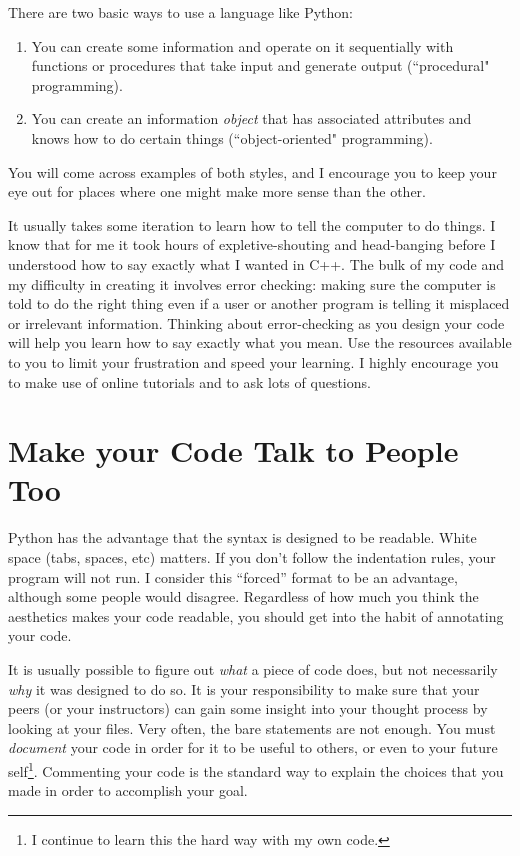 \documentclass[11pt]{article}
\begin{document}
There are two basic ways to use a language like Python: 
\begin{enumerate}
	\item You can create some information and operate on it sequentially with functions or procedures that take input and generate output (``procedural" programming).
	\item You can create an information \emph{object} that has associated attributes and knows how to do certain things (``object-oriented" programming).
\end{enumerate}
You will come across examples of both styles, and I encourage you to keep your eye out for places where one might make more sense than the other.

It usually takes some iteration to learn how to tell the computer to do things.
I know that for me it took hours of expletive-shouting and head-banging before I understood how to say exactly what I wanted in C++.
The bulk of my code and my difficulty in creating it involves error checking: making sure the computer is told to do the right thing even if a user or another program is telling it misplaced or irrelevant information.
Thinking about error-checking as you design your code will help you learn how to say exactly what you mean.
Use the resources available to you to limit your frustration and speed your learning.
I highly encourage you to make use of online tutorials and to ask lots of questions.


\section{Make your Code Talk to People Too}

Python has the advantage that the syntax is designed to be readable.  
White space (tabs, spaces, etc) matters.  
If you don't follow the indentation rules, your program will not run. 
I consider this ``forced'' format to be an advantage, although some people would disagree.
Regardless of how much you think the aesthetics makes your code readable, you should get into the habit of annotating your code. 

It is usually possible to figure out \emph{what} a piece of code does, but not necessarily \emph{why} it was designed to do so.  
It is your responsibility to make sure that your peers (or your instructors) can gain some insight into your thought process by looking at your files.
Very often, the bare statements are not enough.
You must \emph{document} your code in order for it to be useful to others, or even to your future self\footnote{I continue to learn this the hard way with my own code.}.
Commenting your code is the standard way to explain the choices that you made in order to accomplish your goal.  
\end{document}
